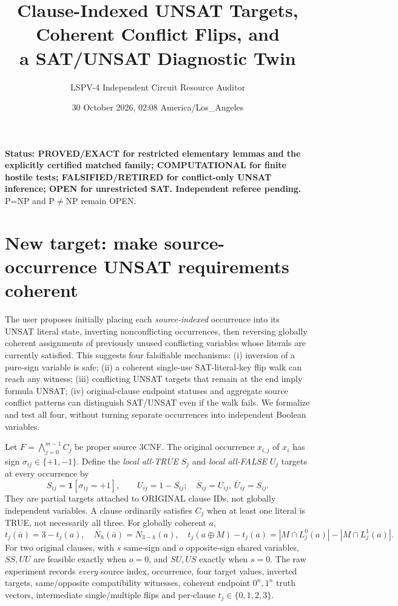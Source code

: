 \documentclass[10pt]{article}
\title{Clause-Indexed UNSAT Targets, Coherent Conflict Flips, and\\ a SAT/UNSAT Diagnostic Twin}
\author{LSPV-4 Independent Circuit Resource Auditor}
\date{30 October 2026, 02:08 America/Los\_Angeles}
\begin{document}
\maketitle
\noindent\textbf{Status: PROVED/EXACT for restricted elementary lemmas and the explicitly certified matched family; COMPUTATIONAL for finite hostile tests; FALSIFIED/RETIRED for conflict-only UNSAT inference; OPEN for unrestricted SAT. Independent referee pending.} P=NP and P$\ne$NP remain OPEN.

\section*{New target: make source-occurrence UNSAT requirements coherent}
The user proposes initially placing each \emph{source-indexed} occurrence into its UNSAT literal state, inverting nonconflicting occurrences, then reversing globally coherent assignments of previously unused conflicting variables whose literals are currently satisfied. This suggests four falsifiable mechanisms: (i) inversion of a pure-sign variable is safe; (ii) a coherent single-use SAT-literal-key flip walk can reach any witness; (iii) conflicting UNSAT targets that remain at the end imply formula UNSAT; (iv) original-clause endpoint statuses and aggregate source conflict patterns can distinguish SAT/UNSAT even if the walk fails. We formalize and test all four, without turning separate occurrences into independent Boolean variables.

Let $F=\bigwedge_{j=0}^{m-1}C_j$ be proper source 3CNF. The original occurrence $x_{i,j}$ of $x_i$ has sign $\sigma_{ij}\in\{+1,-1\}$. Define the \emph{local all-TRUE} $S_j$ and \emph{local all-FALSE} $U_j$ targets at every occurrence by
\[
 S_{ij}=\mathbf{1}[\sigma_{ij}=+1],\qquad U_{ij}=1-S_{ij};
 \quad\overline{S}_{ij}=U_{ij},\ \overline{U}_{ij}=S_{ij}.
\]
They are partial targets attached to ORIGINAL clause IDs, not globally independent variables. A clause ordinarily satisfies $C_j$ when at least one literal is TRUE, not necessarily all three. For globally coherent $a$,
\[
 t_j(\bar a)=3-t_j(a),\quad N_h(\bar a)=N_{3-h}(a),\quad
 t_j(a\oplus M)-t_j(a)=|M\cap L_j^0(a)|-|M\cap L_j^1(a)|.
\]
For two original clauses, with $s$ same-sign and $o$ opposite-sign shared variables, $SS,UU$ are feasible exactly when $o=0$, and $SU,US$ exactly when $s=0$. The raw experiment records \emph{every} source index, occurrence, four target values, inverted targets, same/opposite compatibility witnesses, coherent endpoint $0^n,1^n$ truth vectors, intermediate single/multiple flips and per-clause $t_j\in\{0,1,2,3\}$.
\end{document}
